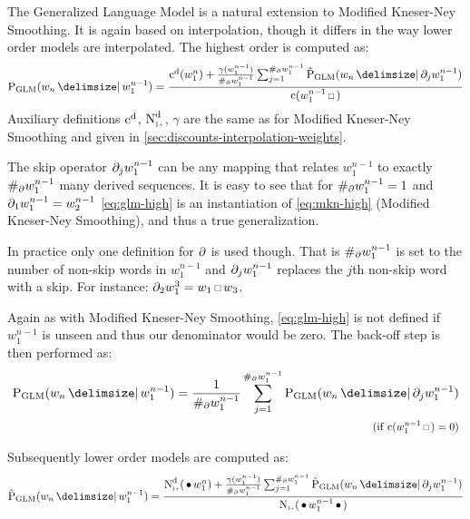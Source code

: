 The Generalized Language Model is a natural extension to Modified Kneser-Ney
Smoothing.
It is again based on interpolation, though it differs in the way lower order
models are interpolated.
The highest order is computed as:
\begin{equation}
  \label{eq:glm-high}
  \ProbGLM{w_n}{w_1^{n-1}} =
    \frac{\DiscountedCount(w_1^n) + \frac{\gamma(w_1^{n-1})}{\NumSkpOp{w_1^{n-1}}}
                                    \sum_{j=1}^{\NumSkpOp{w_1^{n-1}}} \ProbGLM*{w_n}{\SkpOp[j]{w_1^{n-1}}}}
         {\Count(w_1^{n-1} \Skp)}
\end{equation}
Auxiliary definitions $\DiscountedCount$, $\DiscountedCount*$, $\gamma$ are the
same as for Modified Kneser-Ney Smoothing and given in
\cref{sec:discounts-interpolation-weights}.

The skip operator $\SkpOp[j]{w_1^{n-1}}$ can be any mapping that relates
$w_1^{n-1}$ to exactly $\NumSkpOp{w_1^{n-1}}$ many derived sequences.
It is easy to see that for $\NumSkpOp{w_1^{n-1}} = 1$ and
$\SkpOp[1]{w_1^{n-1}} = w_2^{n-1}$ \cref{eq:glm-high} is an
instantiation of \cref{eq:mkn-high} (Modified Kneser-Ney Smoothing), and thus
a true generalization.

In practice only one definition for $\SkpOp$ is used though.
That is $\NumSkpOp{w_1^{n-1}}$ is set to the number of non-skip words in
$w_1^{n-1}$ and $\SkpOp[j]{w_1^{n-1}}$ replaces the $j$th non-skip word with
a skip.
For instance: $\SkpOp[2]{w_1^3} = w_1 \Skp w_3$.

Again as with Modified Kneser-Ney Smoothing, \cref{eq:glm-high} is not
defined if $w_1^{n-1}$ is unseen and thus our denominator would be zero.
The back-off step is then performed as:
\begin{equation}
  \label{eq:glm-backoff}
  \begin{split}
    \ProbGLM{w_n}{w_1^{n-1}} = \frac{1}{\NumSkpOp{w_1^{n-1}}}
                               \sum_{j=1}^{\NumSkpOp{w_1^{n-1}}} \ProbGLM{w_n}{\SkpOp[j]{w_1^{n-1}}} \\
      \hfill \Condition{\Count(w_1^{n-1} \Skp) = 0}
  \end{split}
\end{equation}

Subsequently lower order models are computed as:
\begin{equation}
  \label{eq:glm-low}
  \ProbGLM*{w_n}{w_1^{n-1}} =
    \frac{\DiscountedCount*(\WSkp w_1^n) + \frac{\gamma(w_1^{n-1})}{\NumSkpOp{w_1^{n-1}}}
                                     \sum_{j=1}^{\NumSkpOp{w_1^{n-1}}} \ProbGLM*{w_n}{\SkpOp[j]{w_1^{n-1}}}}
         {\ContCountIp(\WSkp w_1^{n-1} \WSkp)}
\end{equation}

